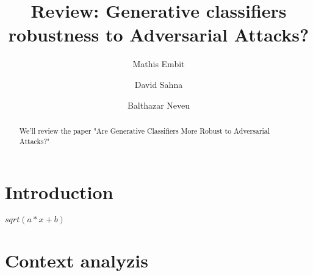 \documentclass[sigconf]{acmart}
\begin{document}
\title{Review: Generative classifiers robustness to Adversarial Attacks?}

\author{Mathis Embit}

\author{David Sahna}

\author{Balthazar Neveu}


\renewcommand{\shortauthors}{MVA et al.}
\begin{abstract}
  We'll review the paper "Are Generative Classifiers More Robust to Adversarial Attacks?" \cite{li2019}
\end{abstract}





\maketitle

\section{Introduction}


\cite{li2019}
$sqrt(a*x+b)$

\section{Context analyzis}



\end{document}
